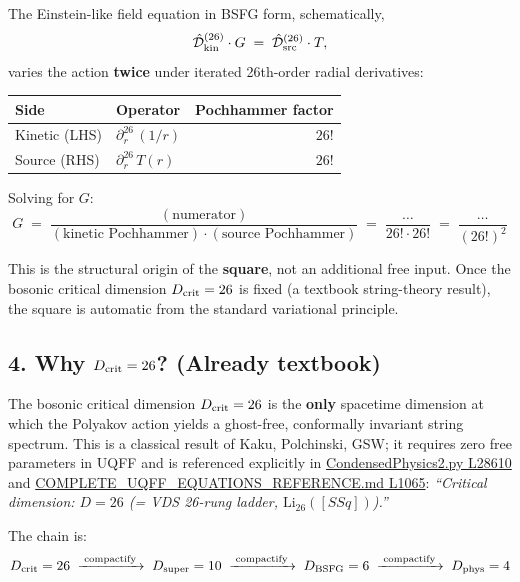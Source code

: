 \documentclass[
]{article}
\newcounter{none} %
\begin{document}
The Einstein-like field equation in BSFG form, schematically,
\[\hat{\mathcal{D}}^{(26)}_{\rm kin} \cdot G \;=\; \hat{\mathcal{D}}^{(26)}_{\rm src} \cdot T,\]
varies the action \textbf{twice} under iterated 26th-order radial
derivatives:

{\def\LTcaptype{none} %
\begin{longtable}[]{@{}llr@{}}
\toprule\noalign{}
Side & Operator & Pochhammer factor \\
\midrule\noalign{}
\endhead
\bottomrule\noalign{}
\endlastfoot
Kinetic (LHS) & \(\partial_r^{26}\,(1/r)\) & \(26!\) \\
Source (RHS) & \(\partial_r^{26}\,T(r)\) & \(26!\) \\
\end{longtable}
}

Solving for \(G\):
\[G \;=\; \frac{(\text{numerator})}{(\text{kinetic Pochhammer}) \cdot (\text{source Pochhammer})} \;=\; \frac{\dots}{26! \cdot 26!} \;=\; \frac{\dots}{(26!)^2}\]

This is the structural origin of the \textbf{square}, not an additional
free input. Once the bosonic critical dimension \(D_{\rm crit}=26\) is
fixed (a textbook string-theory result), the square is automatic from
the standard variational principle.

\subsection{\texorpdfstring{4. Why \(D_{\rm crit} = 26\)? (Already
textbook)}{4. Why D\_\{\textbackslash rm crit\} = 26? (Already textbook)}}\label{why-d_rm-crit-26-already-textbook}

The bosonic critical dimension \(D_{\rm crit} = 26\) is the
\textbf{only} spacetime dimension at which the Polyakov action yields a
ghost-free, conformally invariant string spectrum. This is a classical
result of Kaku, Polchinski, GSW; it requires zero free parameters in
UQFF and is referenced explicitly in
\href{CondensedPhysics2.py\#L28610}{CondensedPhysics2.py L28610} and
\href{COMPLETE_UQFF_EQUATIONS_REFERENCE.md\#L1065}{COMPLETE\_UQFF\_EQUATIONS\_REFERENCE.md
L1065}: \emph{``Critical dimension: \(D = 26\) (= VDS 26-rung ladder,
\(\mathrm{Li}_{26}([SSq])\)).''}

The chain is:
\[D_{\rm crit}=26 \;\xrightarrow{\;\text{compactify}\;}\; D_{\rm super}=10 \;\xrightarrow{\;\text{compactify}\;}\; D_{\rm BSFG}=6 \;\xrightarrow{\;\text{compactify}\;}\; D_{\rm phys}=4\]
\end{document}
